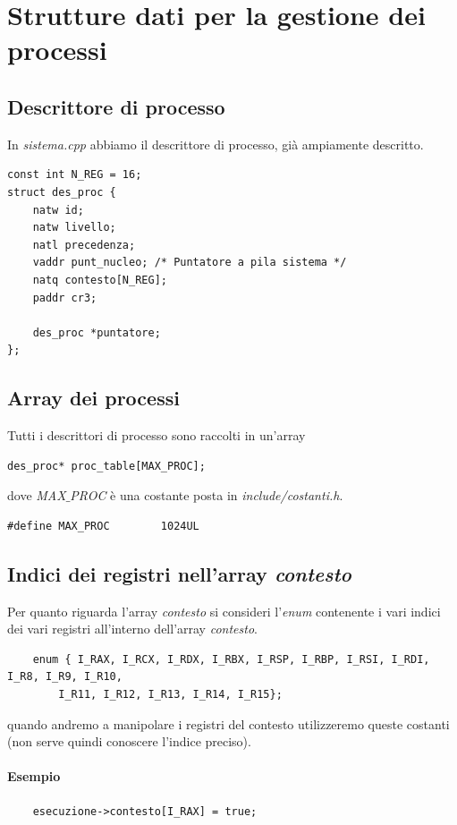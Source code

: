 \documentclass[11pt]{report}
\theoremstyle{definition}
\begin{document}
\section{Strutture dati per la gestione dei processi}
\subsection{Descrittore di processo}
In \emph{sistema.cpp} abbiamo il descrittore di processo, già ampiamente descritto. 
\small 
\begin{verbatim}	
const int N_REG = 16;
struct des_proc {
    natw id;
    natw livello;
    natl precedenza;
    vaddr punt_nucleo; /* Puntatore a pila sistema */
    natq contesto[N_REG];
    paddr cr3;
		
    des_proc *puntatore;
};
\end{verbatim}
\normalsize 
\subsection{Array dei processi}Tutti i descrittori di processo sono raccolti in un'array
\begin{verbatim}
des_proc* proc_table[MAX_PROC];
\end{verbatim}
dove \emph{MAX$\_$PROC} è una costante posta in \emph{include/costanti.h}. 
\begin{verbatim}
#define MAX_PROC        1024UL
\end{verbatim}
\subsection{Indici dei registri nell'array \emph{contesto}} Per quanto riguarda l'array \emph{contesto} si consideri l'\emph{enum} contenente i vari indici dei vari registri all'interno dell'array \emph{contesto}.
\begin{verbatim}
	enum { I_RAX, I_RCX, I_RDX, I_RBX, I_RSP, I_RBP, I_RSI, I_RDI, I_R8, I_R9, I_R10, 
		I_R11, I_R12, I_R13, I_R14, I_R15};
\end{verbatim}
quando andremo a manipolare i registri del contesto utilizzeremo queste costanti (non serve quindi conoscere l'indice preciso). \paragraph{Esempio}
\begin{verbatim}
	esecuzione->contesto[I_RAX] = true;
\end{verbatim}
\end{document}
